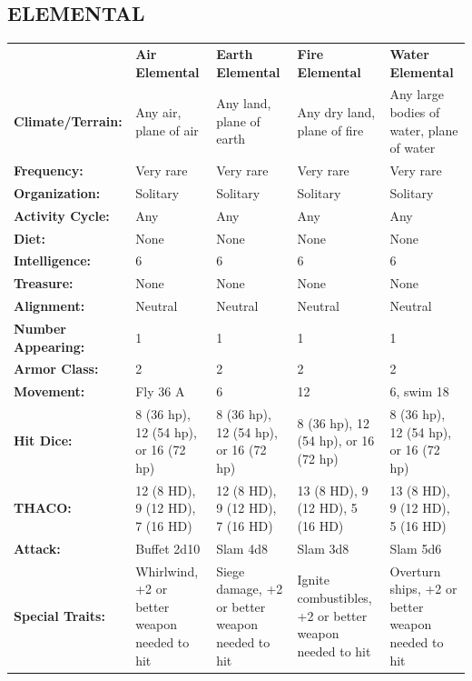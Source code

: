 \noindent \begin{minipage}{\columnwidth}

\vspace{1em}

\subsection{ELEMENTAL}

\noindent \begin{tabular}{p{}g{.17\columnwidth}p{.17\columnwidth}g{.17\columnwidth}p{.17\columnwidth}}
	& \textbf{Air Elemental}	& \textbf{Earth Elemental}	& \textbf{Fire Elemental}	& \textbf{Water Elemental}	\\
\textbf{Climate/Terrain:}	& Any air, plane of air	& Any land, plane of earth	& Any dry land, plane of fire	& Any large bodies of water, plane of water \\
\textbf{Frequency:} 		& Very rare	& Very rare	& Very rare	& Very rare \\
\textbf{Organization:} 		& Solitary	& Solitary	& Solitary	& Solitary \\
\textbf{Activity Cycle:} 	& Any	& Any	& Any	& Any \\
\textbf{Diet:} 				& None	& None	& None	& None \\
\textbf{Intelligence:} 		& 6	& 6	& 6	& 6 \\
\textbf{Treasure:} 			& None	& None	& None	& None \\
\textbf{Alignment:} 		& Neutral	& Neutral	& Neutral	& Neutral \\
\hline
\textbf{Number Appearing:} 	& 1	& 1	& 1	& 1 \\
\textbf{Armor Class:} 		& 2	& 2	& 2	& 2 \\
\textbf{Movement:} 			& Fly 36 A	& 6	& 12	& 6, swim 18 \\
\textbf{Hit Dice:} 			& 8 (36 hp), 12 (54 hp), or 16 (72 hp)	& 8 (36 hp), 12 (54 hp), or 16 (72 hp)	& 8 (36 hp), 12 (54 hp), or 16 (72 hp)	& 8 (36 hp), 12 (54 hp), or 16 (72 hp)	\\
\textbf{THACO:} 			& 12 (8 HD), 9 (12 HD), 7 (16 HD)	& 12 (8 HD), 9 (12 HD), 7 (16 HD)	& 13 (8 HD), 9 (12 HD), 5 (16 HD)	& 13 (8 HD), 9 (12 HD), 5 (16 HD) \\
\textbf{Attack:} 			& Buffet 2d10	& Slam 4d8	& Slam 3d8	& Slam 5d6 \\
\textbf{Special Traits:} & Whirlwind, +2 or better weapon needed to hit	& Siege damage, +2 or better weapon needed to hit	& Ignite combustibles, +2 or better weapon needed to hit	& Overturn ships, +2 or better weapon needed to hit \\

\end{tabular}
\end{minipage}

